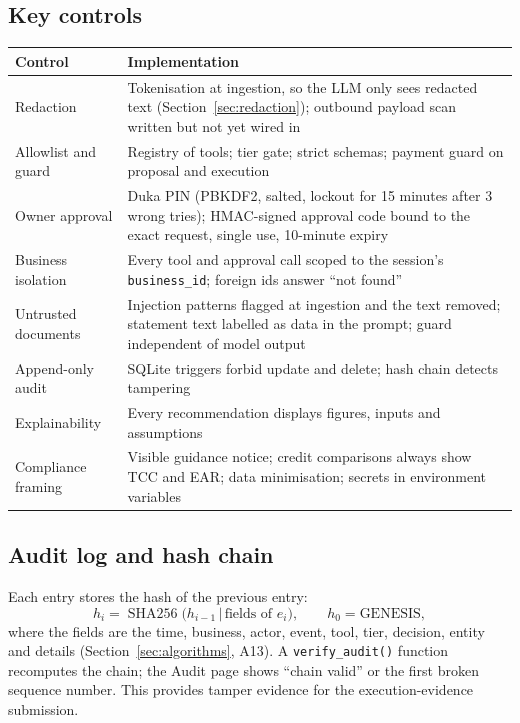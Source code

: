 \documentclass[10pt,a4paper]{article}
\newcommand{\code}[1]{\texttt{\small #1}}
\begin{document}
\subsection{Key controls}
\begin{center}
\begin{tabularx}{\textwidth}{@{}p{3.6cm}Y@{}}
\toprule
\textbf{Control} & \textbf{Implementation}\\
\midrule
Redaction & Tokenisation at ingestion, so the LLM only sees redacted text (Section~\ref{sec:redaction}); outbound payload scan written but not yet wired in\\
Allowlist and guard & Registry of tools; tier gate; strict schemas; payment guard on proposal and execution\\
Owner approval & Duka PIN (PBKDF2, salted, lockout for 15 minutes after 3 wrong tries); HMAC-signed approval code bound to the exact request, single use, 10-minute expiry\\
Business isolation & Every tool and approval call scoped to the session's \code{business\_id}; foreign ids answer ``not found''\\
Untrusted documents & Injection patterns flagged at ingestion and the text removed; statement text labelled as data in the prompt; guard independent of model output\\
Append-only audit & SQLite triggers forbid update and delete; hash chain detects tampering\\
Explainability & Every recommendation displays figures, inputs and assumptions\\
Compliance framing & Visible guidance notice; credit comparisons always show TCC and EAR; data minimisation; secrets in environment variables\\
\bottomrule
\end{tabularx}
\end{center}

\subsection{Audit log and hash chain}
Each entry stores the hash of the previous entry:
\[
h_i=\operatorname{SHA256}\bigl(h_{i-1}\,|\,\text{fields of }e_i\bigr),\qquad h_0=\text{GENESIS},
\]
where the fields are the time, business, actor, event, tool, tier, decision, entity and details (Section~\ref{sec:algorithms}, A13). A \code{verify\_audit()} function recomputes the chain; the Audit page shows ``chain valid'' or the first broken sequence number. This provides tamper evidence for the execution-evidence submission.
\end{document}

